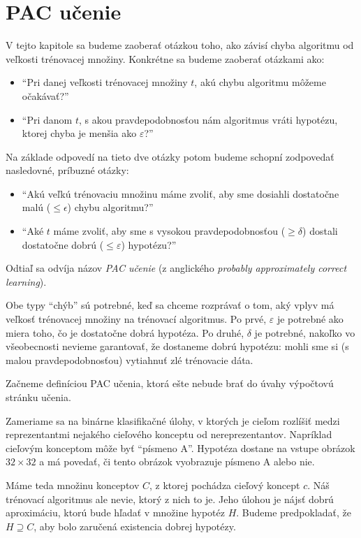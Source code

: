 \chapter{PAC učenie}

V tejto kapitole sa budeme zaoberať otázkou toho, ako závisí chyba
algoritmu od veľkosti trénovacej množiny. Konkrétne sa budeme
zaoberať otázkami ako:
\begin{itemize}
  \item ``Pri danej veľkosti trénovacej množiny $t$, akú chybu algoritmu
    môžeme očakávať?''
  \item ``Pri danom $t$, s akou pravdepodobnosťou nám algoritmus vráti
    hypotézu, ktorej chyba je menšia ako $\varepsilon$?''
\end{itemize}
Na základe odpovedí na tieto dve otázky potom budeme schopní zodpovedať
nasledovné, príbuzné otázky:
\begin{itemize}
  \item ``Akú veľkú trénovaciu množinu máme zvoliť, aby sme dosiahli
    dostatočne malú ($\leq \epsilon$) chybu algoritmu?''
  \item ``Aké $t$ máme zvoliť, aby sme s vysokou pravdepodobnosťou
    ($\geq \delta$) dostali dostatočne dobrú ($\leq \varepsilon$)
    hypotézu?''
\end{itemize}

Odtiaľ sa odvíja názov \emph{PAC učenie} (z anglického
\emph{probably approximately correct learning}).

Obe typy ``chýb'' sú potrebné, keď sa chceme rozprávať o tom,
aký vplyv má veľkosť trénovacej množiny na trénovací algoritmus.
Po prvé, $\varepsilon$ je potrebné ako miera toho, čo je dostatočne
dobrá hypotéza. Po druhé, $\delta$ je potrebné, nakoľko vo všeobecnosti
nevieme garantovať, že dostaneme dobrú hypotézu: mohli sme si
(s malou pravdepodobnosťou) vytiahnuť zlé trénovacie dáta.

Začneme definíciou PAC učenia, ktorá ešte nebude brať do úvahy
výpočtovú stránku učenia.

Zameriame sa na binárne klasifikačné úlohy, v ktorých je cieľom rozlíšiť medzi
reprezentantmi nejakého cieľového konceptu od nereprezentantov. Napríklad
cieľovým konceptom môže byť ``písmeno A''. Hypotéza dostane na vstupe
obrázok $32 \times 32$ a má povedať, či tento obrázok vyobrazuje
písmeno A alebo nie.

Máme teda množinu konceptov $C$, z ktorej pochádza cieľový koncept $c$.
Náš trénovací algoritmus ale nevie, ktorý z nich to je. Jeho úlohou je
nájsť dobrú aproximáciu, ktorú bude hľadať v množine hypotéz $H$. Budeme
predpokladať, že $H \supseteq C$, aby bolo zaručená existencia dobrej
hypotézy.

